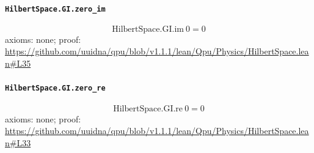\documentclass[11pt]{article}
\begin{document}
\paragraph{\texttt{HilbertSpace.GI.zero\_im}}
\[ \mathrm{HilbertSpace.GI.im}\ 0 = 0 \]
\noindent axioms: none; proof: \url{https://github.com/uuidna/qpu/blob/v1.1.1/lean/Qpu/Physics/HilbertSpace.lean\#L35}

\paragraph{\texttt{HilbertSpace.GI.zero\_re}}
\[ \mathrm{HilbertSpace.GI.re}\ 0 = 0 \]
\noindent axioms: none; proof: \url{https://github.com/uuidna/qpu/blob/v1.1.1/lean/Qpu/Physics/HilbertSpace.lean\#L33}
\end{document}
